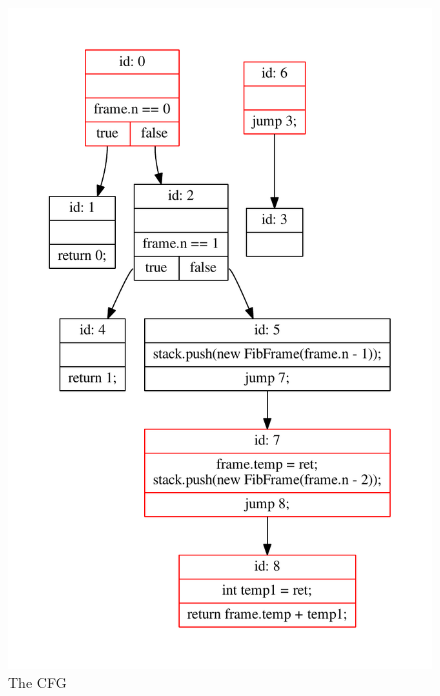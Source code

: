 \begin{figure}[htb]
    \centering
    \includegraphics[width=.5\textwidth]{src/graph/cfg.pdf}
    \caption{The CFG\label{img:cfg}}
\end{figure}
